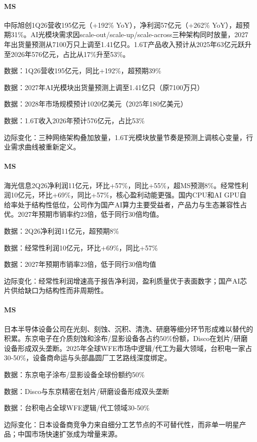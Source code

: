 \documentclass[11pt]{ctexart}
\begin{document}
\paragraph{MS} 中际旭创1Q26营收195亿元（+192\% YoY），净利润57亿元（+262\% YoY），超预期31\%。AI光模块需求因scale-out/scale-up/scale-across三种架构同时放量，2027年出货量预测从7100万只上调至1.41亿只。1.6T产品收入预计从2025年63亿元跃升至2026年576亿元，占比从17\%升至53\%。
{\small\color{refgray}数据：1Q26营收195亿元，同比+192\%，超预期39\%\par}
{\small\color{refgray}数据：2027年AI光模块出货量预测上调至1.41亿只（原7100万只）\par}
{\small\color{refgray}数据：2028年市场规模预计1020亿美元（2025年180亿美元）\par}
{\small\color{refgray}数据：1.6T收入2026年预计576亿元，占比53\%\par}
{\small\color{refgray}边际变化：三种网络架构叠加放量，1.6T光模块放量节奏是预测上调核心变量，行业需求曲线被重新定义。\par}
\paragraph{MS} 海光信息2Q26净利润11亿元，环比+57\%，同比+55\%，超MS预测8\%。经常性利润10亿元，环比+69\%，同比+57\%，核心盈利动能更强。国内CPU和AI GPU自给率处于结构性低位，公司作为国产AI算力主要受益者，产品力与生态兼容性占优。2027年预期市销率约23倍，低于同行30倍均值。
{\small\color{refgray}数据：2Q26净利润11亿元，超预期8\%\par}
{\small\color{refgray}数据：经常性利润10亿元，环比+69\%，同比+57\%\par}
{\small\color{refgray}数据：2027年预期市销率23倍，低于同行30倍均值\par}
{\small\color{refgray}边际变化：经常性利润增速高于报告净利润，盈利质量优于表面数字；国产AI芯片供给缺口为结构性而非周期性。\par}
\paragraph{MS} 日本半导体设备公司在光刻、刻蚀、沉积、清洗、研磨等细分环节形成难以替代的积累。东京电子在介质刻蚀和涂布/显影设备各占约50\%份额，Disco在划片/研磨设备形成双头垄断。2025年全球WFE市场中逻辑/代工为最大领域，台积电一家占30-50\%，设备商命运与头部晶圆厂工艺路线深度绑定。
{\small\color{refgray}数据：东京电子涂布/显影设备全球份额约50\%\par}
{\small\color{refgray}数据：Disco与东京精密在划片/研磨设备形成双头垄断\par}
{\small\color{refgray}数据：台积电占全球WFE逻辑/代工领域30-50\%\par}
{\small\color{refgray}边际变化：日本设备商竞争力来自细分工艺节点的不可替代性，而非单一明星产品；中国市场快速扩张成为增量来源。\par}
\end{document}
